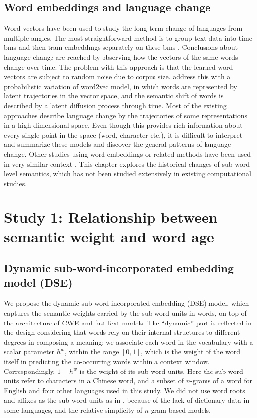 \documentclass[output=paper]{langsci/langscibook}
\begin{document}
\subsection{Word embeddings and language change}
Word vectors have been used to study the long-term change of languages from multiple angles. 
The most straightforward method is to group text data into time bins and then train embeddings separately on these bins \citep{kim-etal-2014-temporal,kulkarni2015statistically,hamilton-etal-2016-diachronic}. Conclusions about language change are reached by observing how the vectors of the same words change over time. The problem with this approach is that the learned word vectors are subject to random noise due to corpus size. 
\citet{bamler17} address this with a probabilistic variation of word2vec model, in which words are represented by latent trajectories in the vector space, and the semantic shift of words is described by a latent diffusion process through time. 
Most of the existing approaches describe language change by the trajectories of some representations in a high dimensional space. Even though this provides rich information about every single point in the space (word, character etc.), it is difficult to interpret and summarize these models and discover the general patterns of language change.
Other studies using word embeddings or related methods have been used in very similar context \citep{tahmasebi2018survey,kutuzov-etal-2018-diachronic}.
This chapter explores the historical changes of sub-word level semantics, which has not been studied extensively in existing computational studies.


\section{Study 1: Relationship between semantic weight and word age}\label{sec:study1}

\subsection{Dynamic sub-word-incorporated embedding model (DSE)}\label{sec:DSE}
We propose the dynamic sub-word-incorporated embedding (DSE) model, which captures the semantic weights carried by the sub-word units in words, on top of the architecture of CWE and fastText models. 
The ``dynamic'' part is reflected in the design considering that words rely on their internal structures to different degrees in composing a meaning: we associate each word in the vocabulary with a scalar parameter $h^w$, within the range $[0,1]$, which is the weight of the word itself in predicting the co-occurring words within a context window. Correspondingly, $1-h^w$ is the weight of its sub-word units. 
Here the sub-word units refer to characters in a Chinese word, and a subset of $n$-grams of a word for English and four other languages used in this study. 
We did not use word roots and affixes as the sub-word units as in \citet{xu2018incorporating}, because of the lack of dictionary data in some languages, and the relative simplicity of $n$-gram-based models. 
\end{document}
